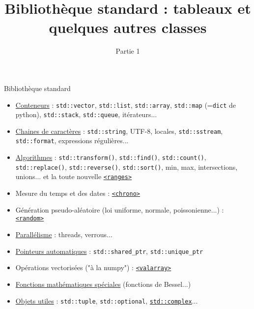 \documentclass[c]{beamer}
\title{Bibliothèque standard : tableaux et quelques autres classes}
\subtitle{Partie 1}
\newcommand{\inline}[1]{\texttt{#1}}
\begin{document}
\maketitle


\begin{frame}[fragile]{Bibliothèque standard}

\begin{itemize}
\item \href{https://en.cppreference.com/w/cpp/container}{Conteneurs} : \inline{std::vector}, \inline{std::list}, \inline{std::array}, \inline{std::map} (=\texttt{dict} de python), \inline{std::stack}, \inline{std::queue}, itérateurs...
\item \href{https://en.cppreference.com/w/cpp/string}{Chaines de caractères} : \inline{std::string}, UTF-8, locales, \inline{std::sstream}, \inline{std::format}, expressions régulières...
\item \href{https://en.cppreference.com/w/cpp/algorithm}{Algorithmes} : \inline{std::transform()}, \inline{std::find()}, \inline{std::count()}, \inline{std::replace()}, \inline{std::reverse()}, \inline{std::sort()}, min, max, intersections, unions... et la toute nouvelle \href{https://en.cppreference.com/w/cpp/ranges}{\texttt{<ranges>}}
\item Mesure du temps et des dates : \href{https://en.cppreference.com/w/cpp/chrono}{\texttt{<chrono>}}
\item Génération pseudo-aléatoire (loi uniforme, normale, poissonienne...) : \href{https://en.cppreference.com/w/cpp/numeric/random}{\texttt{<random>}}
\item \href{https://en.cppreference.com/w/cpp/thread}{Parallélisme} : threads, verrous...
\item \href{https://en.cppreference.com/w/cpp/memory}{Pointeurs automatiques} : \inline{std::shared_ptr}, \inline{std::unique_ptr}
\item Opérations vectorisées ("à la numpy") : \href{https://en.cppreference.com/w/cpp/numeric/valarray}{\texttt{<valarray>}}
\item \href{https://en.cppreference.com/w/cpp/numeric/special_functions}{Fonctions mathématiques spéciales} (fonctions de Bessel...)
\item \href{https://en.cppreference.com/w/cpp/utility#General-purpose_utilities}{Objets utiles} : \inline{std::tuple}, \inline{std::optional}, \href{https://en.cppreference.com/w/cpp/numeric/complex}{\inline{std::complex}}...
\end{itemize}

\end{frame}
\end{document}
